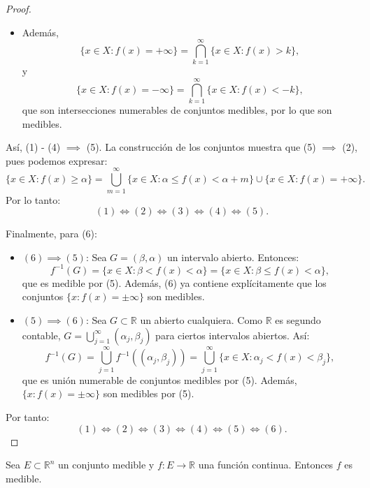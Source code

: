 \begin{proof}
\begin{itemize}
        \item Además,
              \[
                  \{x \in X : f(x) = +\infty\} = \bigcap_{k=1}^{\infty} \{x \in X : f(x) > k\},
              \]
              y
              \[
                  \{x \in X : f(x) = -\infty\} = \bigcap_{k=1}^{\infty} \{x \in X : f(x) < -k\},
              \]
              que son intersecciones numerables de conjuntos medibles, por lo que son
              medibles.
    \end{itemize}
    Así, (1) - (4) $\implies$ (5). La construcción de los conjuntos muestra que (5) $\implies$ (2), pues podemos expresar:
    \[
        \{x \in X : f(x) \geq \alpha\} = \bigcup_{m=1}^{\infty} \{x \in X : \alpha \leq f(x) < \alpha + m\} \cup \{x \in X : f(x) = +\infty\}.
    \]
    Por lo tanto:
    \[
        (1) \iff (2) \iff (3) \iff (4) \iff (5).
    \]

    Finalmente, para (6):
    \begin{itemize}
        \item $(6) \implies (5)$:
              Sea $G=(\beta, \alpha)$ un intervalo abierto. Entonces:
              \[
                  f^{-1}(G) = \{x \in X : \beta < f(x) < \alpha\} = \{x \in X : \beta \leq f(x) < \alpha\},
              \]
              que es medible por (5). Además, (6) ya contiene explícitamente que los
              conjuntos $\{x : f(x)=\pm \infty\}$ son medibles.

        \item $(5) \implies (6)$:
              Sea $G \subset \mathbb{R}$ un abierto cualquiera.
              Como $\mathbb{R}$ es segundo contable, $G = \bigcup_{j=1}^{\infty} (\alpha_j, \beta_j)$ para ciertos intervalos abiertos. Así:
              \[
                  f^{-1}(G) = \bigcup_{j=1}^{\infty} f^{-1}((\alpha_j, \beta_j)) = \bigcup_{j=1}^{\infty} \{x \in X : \alpha_j < f(x) < \beta_j\},
              \]
              que es unión numerable de conjuntos medibles por (5). Además, $\{x :
                  f(x)=\pm\infty\}$ son medibles por (5).
    \end{itemize}

    Por tanto:
    \[
        (1) \iff (2) \iff (3) \iff (4) \iff (5) \iff (6).
    \]
\end{proof}

\begin{corolario}
    Sea $E \subset \mathbb{R}^n$ un conjunto medible y $f: E \to \mathbb{R}$ una función continua. Entonces $f$ es medible.
\end{corolario}

